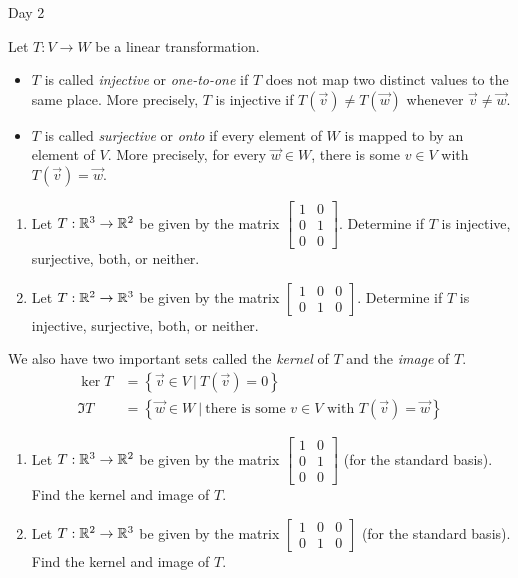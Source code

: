 \documentclass{article}
\begin{document}
Day 2
\begin{app}
Let $T: V \rightarrow W$ be a linear transformation.
\begin{itemize}
\item $T$ is called {\em injective} or {\em one-to-one} if $T$ does not map two distinct values to the same place.  More precisely, $T$ is injective if $T(\vec{v}) \neq T(\vec{w})$ whenever $\vec{v} \neq \vec{w}$.
\item $T$ is called {\em surjective} or {\em onto} if every element of $W$ is mapped to by an element of $V$.  More precisely, for every $\vec{w} \in W$, there is some $v \in V$ with $T(\vec{v})=\vec{w}$.
\end{itemize}

\begin{enumerate}[1)]
\item Let $T: \mathbb{R}^3 \rightarrow \mathbb{R}^2$ be given by the matrix $\begin{bmatrix} 1 & 0 \\ 0 & 1 \\ 0 & 0 \end{bmatrix}$.  Determine if $T$ is injective, surjective, both, or neither.
\item Let $T: \mathbb{R}^2 \rightarrow \mathbb{R}^3$ be given by the matrix $\begin{bmatrix} 1 & 0 &0  \\ 0 & 1 & 0 \end{bmatrix}$.  Determine if $T$ is injective, surjective, both, or neither.
\end{enumerate}


We also have two important sets called the {\em kernel} of $T$ and the {\em image} of $T$.
\begin{align*}
\ker T &= \left\{ \vec{v} \in V\ \big|\ T(\vec{v})=0\right\} \\
\Im T &= \left\{ \vec{w} \in W\ \big|\ \text{there is some }v\in V \text{ with } T(\vec{v})=\vec{w}\right\}
\end{align*}

\begin{enumerate}[1)]
\item Let $T: \mathbb{R}^3 \rightarrow \mathbb{R}^2$ be given by the matrix $\begin{bmatrix} 1 & 0 \\ 0 & 1 \\ 0 & 0 \end{bmatrix}$ (for the standard basis).  Find the kernel and image of $T$.
\item Let $T: \mathbb{R}^2 \rightarrow \mathbb{R}^3$ be given by the matrix $\begin{bmatrix} 1 & 0 &0  \\ 0 & 1 & 0 \end{bmatrix}$ (for the standard basis).  Find the kernel and image of $T$.
\end{enumerate}



\end{app}
\end{document}
